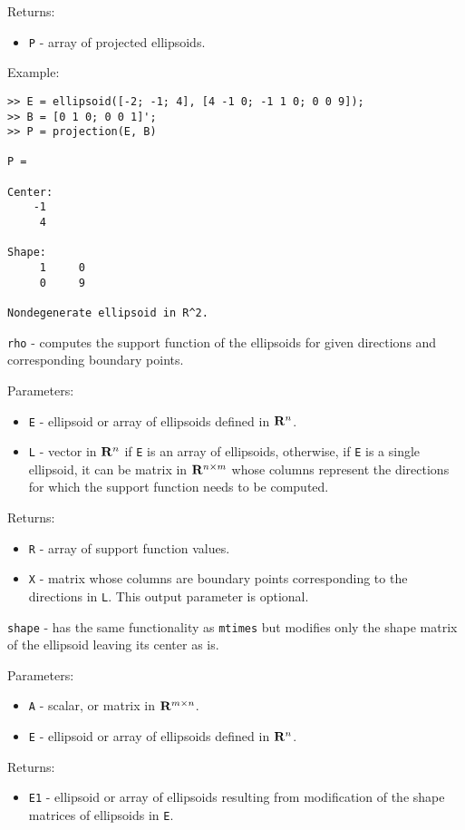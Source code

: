 Returns:
\begin{itemize}
\item {\tt P} - array of projected ellipsoids.
\end{itemize}

Example:
{\tt \begin{verbatim}
>> E = ellipsoid([-2; -1; 4], [4 -1 0; -1 1 0; 0 0 9]);
>> B = [0 1 0; 0 0 1]';
>> P = projection(E, B)

P =

Center:
    -1
     4

Shape:
     1     0
     0     9

Nondegenerate ellipsoid in R^2.
\end{verbatim} }

\newpage

{\Large {\tt rho}} - computes the support function of the ellipsoids for
given directions and corresponding boundary points.

Parameters:
\begin{itemize}
\item {\tt E} - ellipsoid or array of ellipsoids defined in ${\bf R}^n$.
\item {\tt L} - vector in ${\bf R}^n$ if {\tt E} is an array of ellipsoids,
otherwise, if {\tt E} is a single ellipsoid, it can be matrix in
${\bf R}^{n\times m}$ whose columns represent the directions for which
the support function needs to be computed.
\end{itemize}

Returns:
\begin{itemize}
\item {\tt R} - array of support function values.
\item {\tt X} - matrix whose columns are boundary points corresponding
to the directions in {\tt L}. This output parameter is optional.
\end{itemize}

\newpage

{\Large {\tt shape}} - has the same functionality as {\tt mtimes} but
modifies only the shape matrix of the ellipsoid leaving its center as is.

Parameters:
\begin{itemize}
\item {\tt A} - scalar, or matrix in ${\bf R}^{m\times n}$.
\item {\tt E} - ellipsoid or array of ellipsoids defined in ${\bf R}^n$.
\end{itemize}

Returns:
\begin{itemize}
\item {\tt E1} - ellipsoid or array of ellipsoids resulting from modification
of the shape matrices of ellipsoids in {\tt E}.
\end{itemize}

